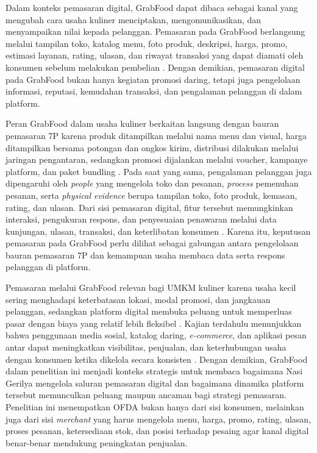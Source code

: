 Dalam konteks pemasaran digital, GrabFood dapat dibaca sebagai kanal yang mengubah cara usaha kuliner menciptakan, mengomunikasikan, dan menyampaikan nilai kepada pelanggan. Pemasaran pada GrabFood berlangsung melalui tampilan toko, katalog menu, foto produk, deskripsi, harga, promo, estimasi layanan, rating, ulasan, dan riwayat transaksi yang dapat diamati oleh konsumen sebelum melakukan pembelian \parencite{chaffey2022digitalmarketing,regina2025kuliner,sophia2025rendanggadih}. Dengan demikian, pemasaran digital pada GrabFood bukan hanya kegiatan promosi daring, tetapi juga pengelolaan informasi, reputasi, kemudahan transaksi, dan pengalaman pelanggan di dalam platform.

Peran GrabFood dalam usaha kuliner berkaitan langsung dengan bauran pemasaran 7P karena produk ditampilkan melalui nama menu dan visual, harga ditampilkan bersama potongan dan ongkos kirim, distribusi dilakukan melalui jaringan pengantaran, sedangkan promosi dijalankan melalui voucher, kampanye platform, dan paket bundling \parencite{khairani2022buahsayur,sophia2025rendanggadih}. Pada saat yang sama, pengalaman pelanggan juga dipengaruhi oleh \textit{people} yang mengelola toko dan pesanan, \textit{process} pemenuhan pesanan, serta \textit{physical evidence} berupa tampilan toko, foto produk, kemasan, rating, dan ulasan. Dari sisi pemasaran digital, fitur tersebut memungkinkan interaksi, pengukuran respons, dan penyesuaian penawaran melalui data kunjungan, ulasan, transaksi, dan keterlibatan konsumen \parencite{chaffey2022digitalmarketing,suharjo2020bogorsnacks}. Karena itu, keputusan pemasaran pada GrabFood perlu dilihat sebagai gabungan antara pengelolaan bauran pemasaran 7P dan kemampuan usaha membaca data serta respons pelanggan di platform.

Pemasaran melalui GrabFood relevan bagi UMKM kuliner karena usaha kecil sering menghadapi keterbatasan lokasi, modal promosi, dan jangkauan pelanggan, sedangkan platform digital membuka peluang untuk memperluas pasar dengan biaya yang relatif lebih fleksibel \parencite{regina2025kuliner,suharjo2020bogorsnacks}. Kajian terdahulu menunjukkan bahwa penggunaan media sosial, katalog daring, \textit{e-commerce}, dan aplikasi pesan antar dapat meningkatkan visibilitas, penjualan, dan keterhubungan usaha dengan konsumen ketika dikelola secara konsisten \parencite{roslam2021markisaaurora,sophia2025rendanggadih}. Dengan demikian, GrabFood dalam penelitian ini menjadi konteks strategis untuk membaca bagaimana Nasi Gerilya mengelola saluran pemasaran digital dan bagaimana dinamika platform tersebut memunculkan peluang maupun ancaman bagi strategi pemasaran. Penelitian ini menempatkan OFDA bukan hanya dari sisi konsumen, melainkan juga dari sisi \textit{merchant} yang harus mengelola menu, harga, promo, rating, ulasan, proses pesanan, ketersediaan stok, dan posisi terhadap pesaing agar kanal digital benar-benar mendukung peningkatan penjualan.

